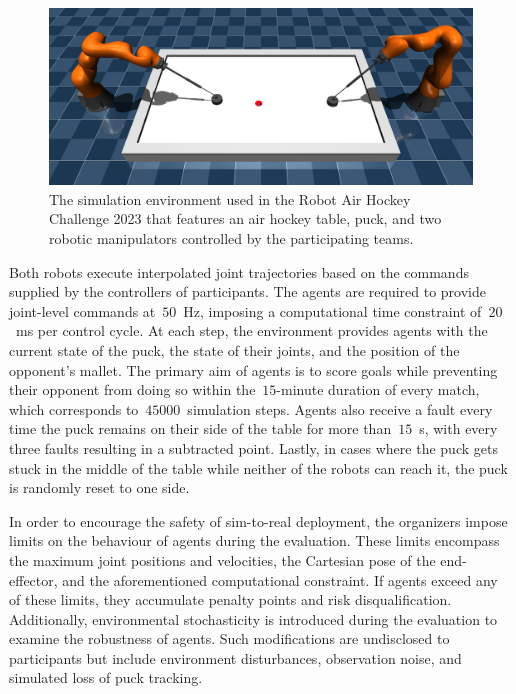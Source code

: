\documentclass{article}
\begin{document}
\begin{figure}[ht]
    \centering
    \includegraphics[width=1.0\linewidth]{graphics/air_hockey_sim.png}
    \caption{The simulation environment used in the Robot Air Hockey Challenge 2023 that features an air hockey table, puck, and two robotic manipulators controlled by the participating teams.}
    \label{fig:air_hockey_sim}
\end{figure}

Both robots execute interpolated joint trajectories based on the commands supplied by the controllers of participants. The agents are required to provide joint-level commands at~\(50\)~Hz, imposing a computational time constraint of~\(20\)~ms per control cycle. At each step, the environment provides agents with the current state of the puck, the state of their joints, and the position of the opponent's mallet. The primary aim of agents is to score goals while preventing their opponent from doing so within the~\(15\)-minute duration of every match, which corresponds to~\(45000\)~simulation steps. Agents also receive a fault every time the puck remains on their side of the table for more than~\(15\)~s, with every three faults resulting in a subtracted point. Lastly, in cases where the puck gets stuck in the middle of the table while neither of the robots can reach it, the puck is randomly reset to one side.

In order to encourage the safety of sim-to-real deployment, the organizers impose limits on the behaviour of agents during the evaluation. These limits encompass the maximum joint positions and velocities, the Cartesian pose of the end-effector, and the aforementioned computational constraint. If agents exceed any of these limits, they accumulate penalty points and risk disqualification. Additionally, environmental stochasticity is introduced during the evaluation to examine the robustness of agents. Such modifications are undisclosed to participants but include environment disturbances, observation noise, and simulated loss of puck tracking.
\end{document}
